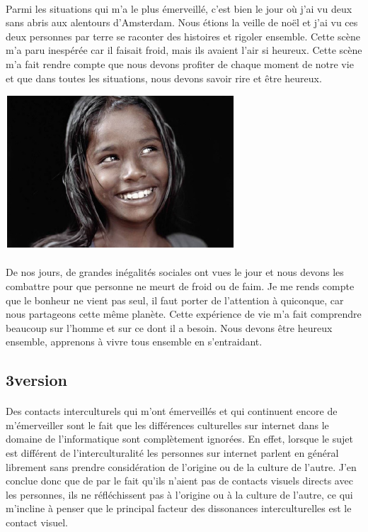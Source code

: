 \paragraph{} Parmi les situations qui m'a le plus émerveillé, c'est bien le
jour où j'ai vu deux sans abris aux alentours d'Amsterdam.  Nous étions la
veille de noël et j'ai vu ces deux personnes par terre se raconter des
histoires et rigoler ensemble. Cette scène m'a paru inespérée car il faisait
froid, mais ils avaient l'air si heureux.  Cette scène m'a fait rendre compte
que nous devons profiter de chaque moment de notre vie et que dans toutes les
situations, nous devons savoir rire et être heureux.

\begin{center}
	\includegraphics[scale=0.7]{Amsterdam2.jpg}
\end{center}

\paragraph{} De nos jours, de grandes inégalités sociales ont vues le jour et
nous devons les combattre pour que personne ne meurt de froid ou de faim. Je me
rends compte que le bonheur ne vient pas seul, il faut porter de l'attention à
quiconque, car nous partageons cette même planète.  Cette expérience de vie m'a
fait comprendre beaucoup sur l'homme et sur ce dont il a besoin. Nous devons
être heureux ensemble, apprenons à vivre tous ensemble en s'entraidant.

\subsection{3\ieme version}

\paragraph{} Des contacts interculturels qui m'ont émerveillés et qui
continuent encore de m'émerveiller sont le fait que les différences culturelles
sur internet dans le domaine de l'informatique sont complètement ignorées. En
effet, lorsque le sujet est différent de l'interculturalité les personnes sur
internet parlent en général librement sans prendre considération de l'origine
ou de la culture de l'autre. J'en conclue donc que de par le fait qu'ils
n'aient pas de contacts visuels directs avec les personnes, ils ne
réfléchissent pas à l'origine ou à la culture de l'autre, ce qui m'incline à
penser que le principal facteur des dissonances interculturelles est le contact
visuel.

